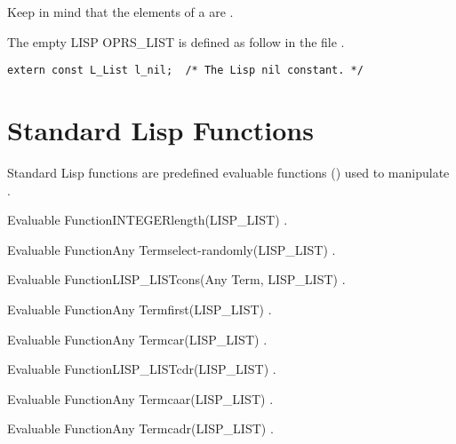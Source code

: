 Keep in mind that the elements of a  are .

The empty LISP OPRS\_LIST is defined as follow in the file .
\begin{verbatim}
extern const L_List l_nil;  /* The Lisp nil constant. */
\end{verbatim}

\section{Standard Lisp Functions}

Standard Lisp functions are predefined evaluable functions
() used to manipulate .

\begin{typeefa}{Evaluable Function}{INTEGER}{length}{(LISP\_LIST)}
.
\end{typeefa}

\begin{typeefa}{Evaluable Function}{Any Term}{select-randomly}{(LISP\_LIST)}
.
\end{typeefa}

\begin{typeefa}{Evaluable Function}{LISP\_LIST}{cons}{(Any Term, LISP\_LIST)}
.
\end{typeefa}

\begin{typeefa}{Evaluable Function}{Any Term}{first}{(LISP\_LIST)}
.
\end{typeefa}

\begin{typeefa}{Evaluable Function}{Any Term}{car}{(LISP\_LIST)}
.
\end{typeefa}

\begin{typeefa}{Evaluable Function}{LISP\_LIST}{cdr}{(LISP\_LIST)}
.
\end{typeefa}

\begin{typeefa}{Evaluable Function}{Any Term}{caar}{(LISP\_LIST)}
.
\end{typeefa}

\begin{typeefa}{Evaluable Function}{Any Term}{cadr}{(LISP\_LIST)}
.
\end{typeefa}

